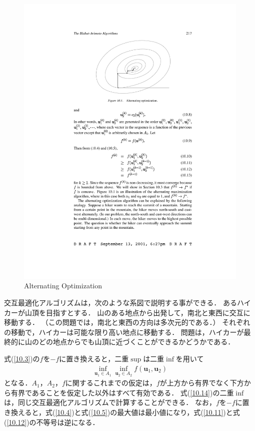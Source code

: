 \documentclass{ltjsarticle}
\theoremstyle{definition}
\begin{document}
\begin{figure}[htbp]
  \label{fig10.1}
  \begin{center}
  \includegraphics{Fig10-1.pdf}
  \caption{Alternating Optimization}
  \end{center}
\end{figure}

交互最適化アルゴリズムは，次のような系図で説明する事ができる．
あるハイカーが山頂を目指すとする．
山のある地点から出発して，南北と東西に交互に移動する．
（この問題では，南北と東西の方向は多次元的である．）
それぞれの移動で，ハイカーは可能な限り高い地点に移動する．
問題は，ハイカーが最終的に山のどの地点からでも山頂に近づくことができるかどうかである．

式(\ref{10.3})の$f$を$-f$に置き換えると，二重$\sup$は二重$\inf$を用いて
\begin{eqnarray}
  \label{10.14}
  \inf_{\mathbf{u}_1 \in A_1} \inf_{\mathbf{u}_2 \in A_2} f \left( \mathbf{u}_1, \mathbf{u}_2 \right)
\end{eqnarray}
となる．$A_1$，$A_2$，$f$に関するこれまでの仮定は，$f$が上方から有界でなく下方から有界であることを仮定した以外はすべて有効である．
式(\ref{10.14})の二重$\inf$は，同じ交互最適化アルゴリズムで計算することができる．
なお，$f$を$-f$に置き換えると，式(\ref{10.4})と式(\ref{10.5})の最大値は最小値になり，式(\ref{10.11})と式(\ref{10.12})の不等号は逆になる．
\end{document}
